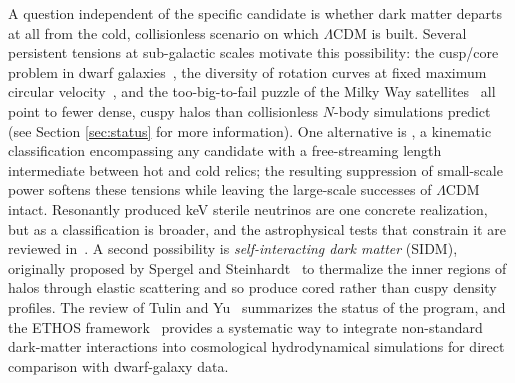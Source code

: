 A question independent of the specific candidate is whether dark matter departs at all from the cold, collisionless scenario on which $\Lambda$CDM is built.
Several persistent tensions at sub-galactic scales motivate this possibility: the cusp/core problem in dwarf galaxies~\cite{Flores:1994gz,Moore:1994yx}, the diversity of rotation curves at fixed maximum circular velocity~\cite{Oman:2015xda}, and the too-big-to-fail puzzle of the Milky Way satellites~\cite{Boylan-Kolchin:2011qkt,Boylan-Kolchin:2011lmk} all point to fewer dense, cuspy halos than collisionless $N$-body simulations predict~\cite{Bullock:2017xww} (see Section \ref{sec:status} for more information).
One alternative is \emph{\WDM}, a kinematic classification encompassing any candidate with a free-streaming length intermediate between hot and cold relics; the resulting suppression of small-scale power softens these tensions while leaving the large-scale successes of $\Lambda$CDM intact.
Resonantly produced keV sterile neutrinos are one concrete realization, but \WDM as a classification is broader, and the astrophysical tests that constrain it are reviewed in~\cite{Adhikari:2022sbh}.
A second possibility is \emph{self-interacting dark matter} (SIDM), originally proposed by Spergel and Steinhardt~\cite{Spergel:1999mh} to thermalize the inner regions of halos through elastic scattering and so produce cored rather than cuspy density profiles.
The review of Tulin and Yu~\cite{Tulin:2017ara} summarizes the status of the program, and the ETHOS framework~\cite{Cyr-Racine:2015ihg} provides a systematic way to integrate non-standard dark-matter interactions into cosmological hydrodynamical simulations for direct comparison with dwarf-galaxy data.

